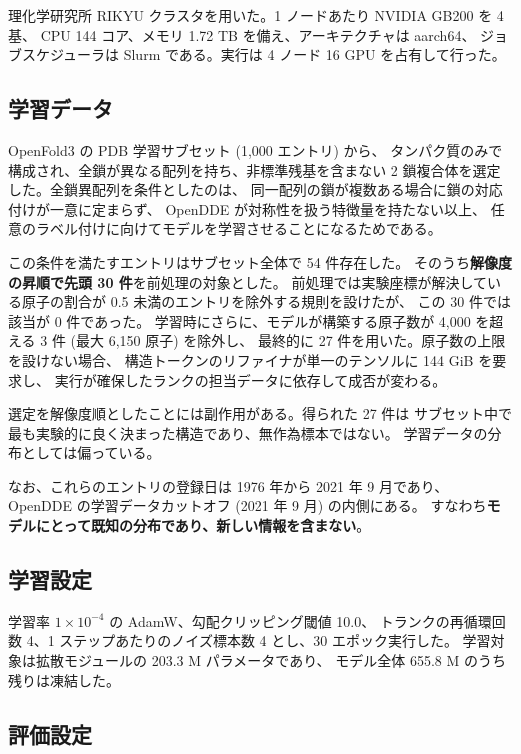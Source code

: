 \documentclass[11pt,a4paper]{article}
\begin{document}
理化学研究所 RIKYU クラスタを用いた。1 ノードあたり NVIDIA GB200 を 4 基、
CPU 144 コア、メモリ 1.72 TB を備え、アーキテクチャは aarch64、
ジョブスケジューラは Slurm である。実行は 4 ノード 16 GPU を占有して行った。

\subsection{学習データ}

OpenFold3 の PDB 学習サブセット (1,000 エントリ) から、
タンパク質のみで構成され、全鎖が異なる配列を持ち、非標準残基を含まない
2 鎖複合体を選定した。全鎖異配列を条件としたのは、
同一配列の鎖が複数ある場合に鎖の対応付けが一意に定まらず、
OpenDDE が対称性を扱う特徴量を持たない以上、
任意のラベル付けに向けてモデルを学習させることになるためである。

この条件を満たすエントリはサブセット全体で 54 件存在した。
そのうち\textbf{解像度の昇順で先頭 30 件}を前処理の対象とした。
前処理では実験座標が解決している原子の割合が 0.5 未満のエントリを除外する規則を設けたが、
この 30 件では該当が 0 件であった。
学習時にさらに、モデルが構築する原子数が 4,000 を超える 3 件 (最大 6,150 原子) を除外し、
最終的に 27 件を用いた。原子数の上限を設けない場合、
構造トークンのリファイナが単一のテンソルに 144 GiB を要求し、
実行が確保したランクの担当データに依存して成否が変わる。

選定を解像度順としたことには副作用がある。得られた 27 件は
サブセット中で最も実験的に良く決まった構造であり、無作為標本ではない。
学習データの分布としては偏っている。

なお、これらのエントリの登録日は 1976 年から 2021 年 9 月であり、
OpenDDE の学習データカットオフ (2021 年 9 月) の内側にある。
すなわち\textbf{モデルにとって既知の分布であり、新しい情報を含まない}。

\subsection{学習設定}

学習率 $1\times10^{-4}$ の AdamW、勾配クリッピング閾値 10.0、
トランクの再循環回数 4、1 ステップあたりのノイズ標本数 4 とし、30 エポック実行した。
学習対象は拡散モジュールの 203.3 M パラメータであり、
モデル全体 655.8 M のうち残りは凍結した。

\subsection{評価設定}
\end{document}
